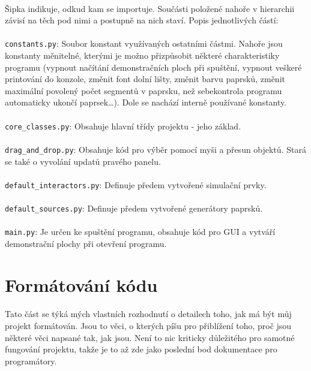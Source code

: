 \documentclass[12pt,a4paper]{report}
\begin{document}
\paragraph{} Šipka indikuje, odkud kam se importuje. Součásti položené nahoře v hierarchii závisí na těch pod nimi a postupně na nich staví. Popis jednotlivých částí:
\paragraph{} \lstinline{constants.py}: Soubor konstant využívaných ostatními částmi. Nahoře jsou konstanty měnitelné, kterými je možno přizpůsobit některé charakteristiky programu (vypnout načítání demonstračních ploch při spuštění, vypnout veškeré printování do konzole, změnit font dolní lišty, změnit barvu paprsků, změnit maximální povolený počet segmentů v paprsku, než sebekontrola programu automaticky ukončí paprsek\dots). Dole se nachází interně používané konstanty.
\paragraph{} \lstinline{core_classes.py}: Obsahuje hlavní třídy projektu - jeho základ.
\paragraph{} \lstinline{drag_and_drop.py}: Obsahuje kód pro výběr pomocí myši a přesun objektů. Stará se také o vyvolání updatů pravého panelu.
\paragraph{} \lstinline{default_interactors.py}: Definuje předem vytvořené simulační prvky.
\paragraph{} \lstinline{default_sources.py}: Definuje předem vytvořené generátory paprsků.
\paragraph{} \lstinline{main.py}: Je určen ke spuštění programu, obsahuje kód pro GUI a vytváří demonstrační plochy při otevření programu.
\section{Formátování kódu}
\paragraph{} Tato část se týká mých vlastních rozhodnutí o detailech toho, jak má být můj projekt formátován. Jsou to věci, o kterých píšu pro přiblížení toho, proč jsou některé věci napsané tak, jak jsou. Není to nic kriticky důležitého pro samotné fungování projektu, takže je to až zde jako poslední bod dokumentace pro programátory.
\end{document}
